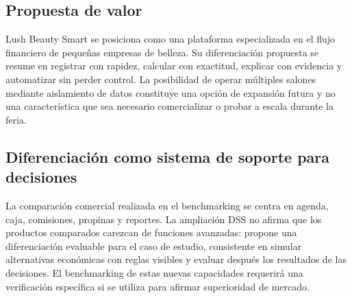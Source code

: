 
\subsection{Propuesta de valor}

Lush Beauty Smart se posiciona como una plataforma especializada en el flujo financiero de pequeñas empresas de belleza. Su diferenciación propuesta se resume en registrar con rapidez, calcular con exactitud, explicar con evidencia y automatizar sin perder control. La posibilidad de operar múltiples salones mediante aislamiento de datos constituye una opción de expansión futura y no una característica que sea necesario comercializar o probar a escala durante la feria.


\subsection{Diferenciación como sistema de soporte para decisiones}

La comparación comercial realizada en el benchmarking se centra en agenda, caja, comisiones, propinas y reportes. La ampliación DSS no afirma que los productos comparados carezcan de funciones avanzadas: propone una diferenciación evaluable para el caso de estudio, consistente en simular alternativas económicas con reglas visibles y evaluar después los resultados de las decisiones. El benchmarking de estas nuevas capacidades requerirá una verificación específica si se utiliza para afirmar superioridad de mercado.

